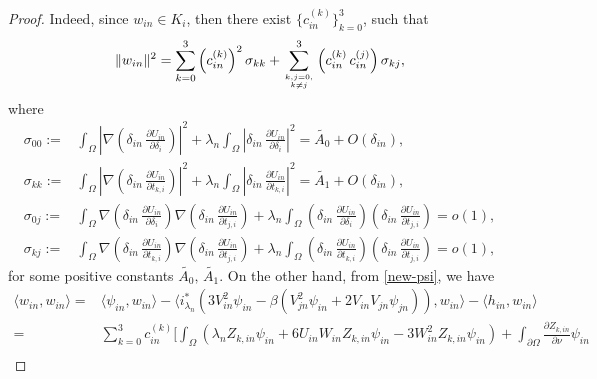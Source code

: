 \documentclass[a4paper,reqno,11pt,oneside]{amsart}
\numberwithin{equation}{section}
\begin{document}
\begin{proof}
Indeed, since $w_{in}\in K_i$, then there exist $\{c_{in}^{(k)}\}_{k=0}^{3}$, such that 
\begin{align}
    \label{w-1}\|w_{in}\|^2=\sum_{k=0}^3\left(c_{in}^{(k)}\right)^2\sigma_{kk}+\sum_{k,j=0,\atop k\neq j}^3\left(c_{in}^{(k)}\,c_{in}^{(j)}\right)\sigma_{kj},
\end{align}
where
\begin{align}\label{useful}
\sigma_{00}:=&\displaystyle\int_{\Omega}\left|\nabla\left(\delta_{in}\,\frac{\partial U_{in}}{\partial \delta_i}\right)\right|^2+\lambda_n\displaystyle\int_{\Omega}\left|\delta_{in}\,\frac{\partial U_{in}}{\partial \delta_i}\right|^2=\widetilde{A_0}+O(\delta_{in}),\nonumber\\\sigma_{kk}:=&\displaystyle\int_{\Omega}\left|\nabla\left(\delta_{in}\,\frac{\partial U_{in}}{\partial t_{k,i}}\right)\right|^2+\lambda_n\displaystyle\int_{\Omega}\left|\delta_{in}\,\frac{\partial U_{in}}{\partial t_{k,i}}\right|^2=\widetilde{A_1}+O(\delta_{in}),\nonumber\\
\sigma_{0j}:=&\displaystyle\int_{\Omega}\nabla\left(\delta_{in}\,\frac{\partial U_{in}}{\partial\delta_{i}}\right)\nabla\left(\delta_{in}\,\frac{\partial U_{in}}{\partial t_{j,i}}\right)+\lambda_n\displaystyle\int_{\Omega}\left(\delta_{in}\,\frac{\partial U_{in}}{\partial \delta_{i}}\right)\left(\delta_{in}\,\frac{\partial U_{in}}{\partial t_{j,i}}\right)=o(1),\nonumber\\
\sigma_{kj}:=&\displaystyle\int_{\Omega}\nabla\left(\delta_{in}\,\frac{\partial U_{in}}{\partial t_{k,i}}\right)\nabla\left(\delta_{in}\,\frac{\partial U_{in}}{\partial t_{j,i}}\right)+\lambda_n\displaystyle\int_{\Omega}\left(\delta_{in}\,\frac{\partial U_{in}}{\partial t_{k,i}}\right)\left(\delta_{in}\,\frac{\partial U_{in}}{\partial t_{j,i}}\right)=o(1),
\end{align}
for some positive constants $\widetilde{A_0},\,\widetilde{A_1}$. On the other hand, from \eqref{new-psi}, we have 
\begin{align}
    \label{w-2}
  \langle w_{in},w_{in}\rangle=& \langle \psi_{in},w_{in}\rangle-\langle i_{\lambda_n}^{*}\left(3V_{in}^2\psi_{in}-\beta\left(V_{jn}^2\psi_{in}+2V_{in}V_{jn}\psi_{jn}\right)\right),w_{in}\rangle-\langle h_{in},w_{in}\rangle\nonumber\\
  =&\sum_{k=0}^3c_{in}^{(k)}\Bigg[\displaystyle\int_{\Omega}\left(\lambda_n Z_{k,in}\psi_{in}+6U_{in}W_{in}Z_{k,in}\psi_{in}-3W^2_{in}Z_{k,in}\psi_{in}\right)+\displaystyle\int_{\partial\Omega}\frac{\partial Z_{k,in}}{\partial \nu}\psi_{in}\nonumber\\

\end{align}
\end{proof}
\end{document}
